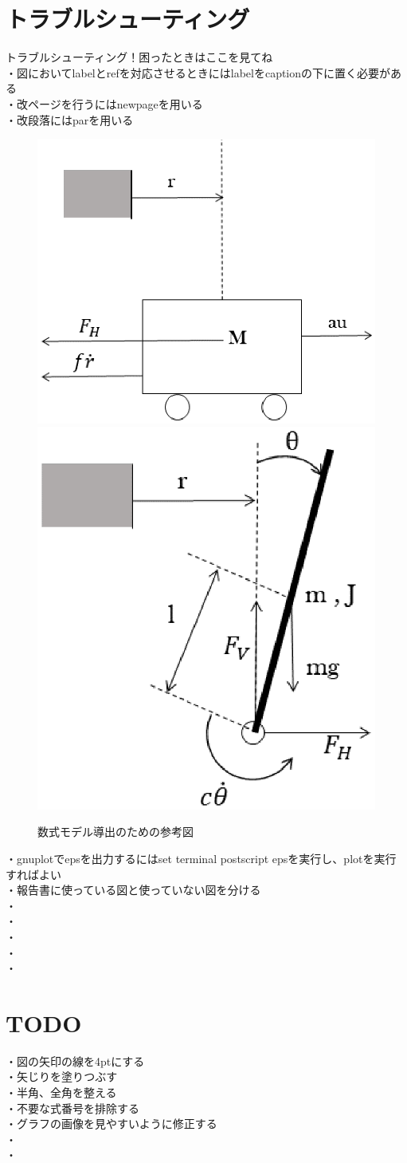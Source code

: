 \section{トラブルシューティング}
トラブルシューティング！困ったときはここを見てね\\
・図においてlabelとrefを対応させるときにはlabelをcaptionの下に置く必要がある\\
・改ページを行うにはnewpageを用いる\\
・改段落にはparを用いる\\
\begin{figure}[h]
		\centering
		\includegraphics[width=0.4\linewidth]{gazo/cart.eps}
		\includegraphics[width=0.4\linewidth]{gazo/stick.eps}
		\caption{数式モデル導出のための参考図}
		\label{image:test}
\end{figure}
・gnuplotでepsを出力するにはset terminal postscript epsを実行し、plotを実行すればよい\\
・報告書に使っている図と使っていない図を分ける\\
・\\
・\\
・\\
・\\
・\\

\section{TODO}
・図の矢印の線を4ptにする\\
・矢じりを塗りつぶす\\
・半角、全角を整える\\
・不要な式番号を排除する\\
・グラフの画像を見やすいように修正する\\
・\\
・\\